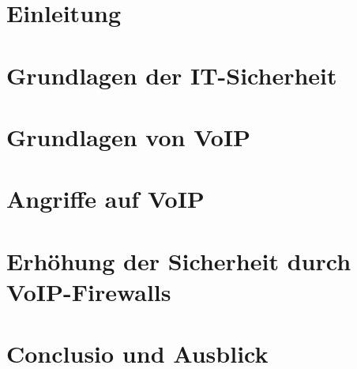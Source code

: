 \documentclass [bachelor,a4paper,11pt,oneside,deutsch,todo,nolistofalgorithms,webreferences,noglossary,listoflistings,acronym]{INSOthesis}
\begin{document}
\maketitle

%
%
%
%

\chapter{Einleitung}
\label{ch:ch1}


\chapter{Grundlagen der IT-Sicherheit}
\label{ch:ch2}


\chapter{Grundlagen von VoIP}
\label{ch:ch3}


\chapter{Angriffe auf VoIP}
\label{ch:ch4}


\chapter{Erhöhung der Sicherheit durch VoIP-Firewalls}
\label{ch:ch5}


\chapter{Conclusio und Ausblick}
\label{ch:ch7}




\BackMatter

\cleardoublepage
\appendix


%
%
\end{document}
